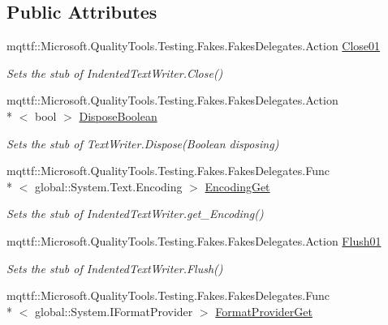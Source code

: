 \subsection*{Public Attributes}
\begin{DoxyCompactItemize}
\item 
mqttf\-::\-Microsoft.\-Quality\-Tools.\-Testing.\-Fakes.\-Fakes\-Delegates.\-Action \hyperlink{class_system_1_1_code_dom_1_1_compiler_1_1_fakes_1_1_stub_indented_text_writer_a700780ea7cf1b28d1caafd5f303a931c}{Close01}
\begin{DoxyCompactList}\small\item\em Sets the stub of Indented\-Text\-Writer.\-Close()\end{DoxyCompactList}\item 
mqttf\-::\-Microsoft.\-Quality\-Tools.\-Testing.\-Fakes.\-Fakes\-Delegates.\-Action\\*
$<$ bool $>$ \hyperlink{class_system_1_1_code_dom_1_1_compiler_1_1_fakes_1_1_stub_indented_text_writer_ab5b5ffd0174fc3234cc78fbf11293bba}{Dispose\-Boolean}
\begin{DoxyCompactList}\small\item\em Sets the stub of Text\-Writer.\-Dispose(\-Boolean disposing)\end{DoxyCompactList}\item 
mqttf\-::\-Microsoft.\-Quality\-Tools.\-Testing.\-Fakes.\-Fakes\-Delegates.\-Func\\*
$<$ global\-::\-System.\-Text.\-Encoding $>$ \hyperlink{class_system_1_1_code_dom_1_1_compiler_1_1_fakes_1_1_stub_indented_text_writer_a617324c42af76d6b21ce8f22410b38f8}{Encoding\-Get}
\begin{DoxyCompactList}\small\item\em Sets the stub of Indented\-Text\-Writer.\-get\-\_\-\-Encoding()\end{DoxyCompactList}\item 
mqttf\-::\-Microsoft.\-Quality\-Tools.\-Testing.\-Fakes.\-Fakes\-Delegates.\-Action \hyperlink{class_system_1_1_code_dom_1_1_compiler_1_1_fakes_1_1_stub_indented_text_writer_ab9f60f577f93486430ab76b2f8dde6cd}{Flush01}
\begin{DoxyCompactList}\small\item\em Sets the stub of Indented\-Text\-Writer.\-Flush()\end{DoxyCompactList}\item 
mqttf\-::\-Microsoft.\-Quality\-Tools.\-Testing.\-Fakes.\-Fakes\-Delegates.\-Func\\*
$<$ global\-::\-System.\-I\-Format\-Provider $>$ \hyperlink{class_system_1_1_code_dom_1_1_compiler_1_1_fakes_1_1_stub_indented_text_writer_abbf91630d7b8b647d9b36bdc102224a0}{Format\-Provider\-Get}

\end{DoxyCompactItemize}

